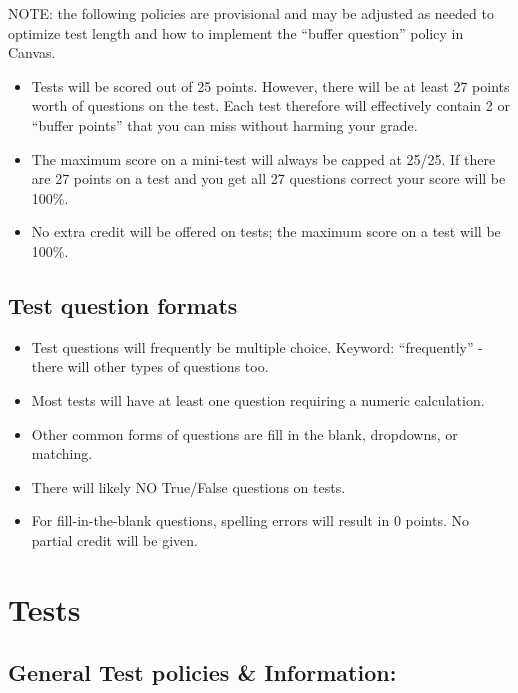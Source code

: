 \documentclass[
]{book}
\providecommand{\tightlist}{%
  \setlength{\itemsep}{0pt}\setlength{\parskip}{0pt}}
\begin{document}
NOTE: the following policies are provisional and may be adjusted as needed to optimize test length and how to implement the ``buffer question'' policy in Canvas.

\begin{itemize}
\tightlist
\item
  Tests will be scored out of 25 points. However, there will be at least 27 points worth of questions on the test. Each test therefore will effectively contain 2 or ``buffer points'' that you can miss without harming your grade.
\item
  The maximum score on a mini-test will always be capped at 25/25. If there are 27 points on a test and you get all 27 questions correct your score will be 100\%.
\item
  No extra credit will be offered on tests; the maximum score on a test will be 100\%.
\end{itemize}

\hypertarget{test-question-formats}{%
\section{Test question formats}\label{test-question-formats}}

\begin{itemize}
\tightlist
\item
  Test questions will frequently be multiple choice. Keyword: ``frequently'' - there will other types of questions too.
\item
  Most tests will have at least one question requiring a numeric calculation.\\
\item
  Other common forms of questions are fill in the blank, dropdowns, or matching.
\item
  There will likely NO True/False questions on tests.
\item
  For fill-in-the-blank questions, spelling errors will result in 0 points. No partial credit will be given.
\end{itemize}

\hypertarget{tests}{%
\chapter{Tests}\label{tests}}

\hypertarget{general-test-policies-information}{%
\section{General Test policies \& Information:}\label{general-test-policies-information}}
\end{document}
